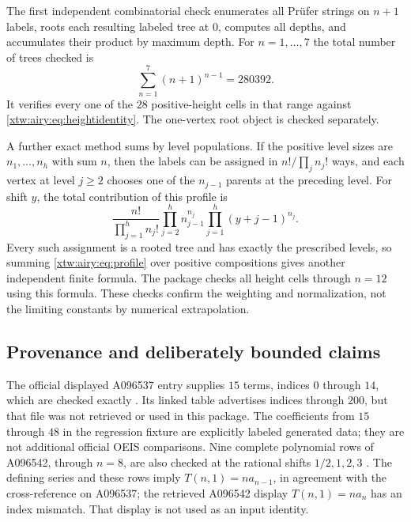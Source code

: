 \documentclass[11pt]{article}
\theoremstyle{remark}\newtheorem{remark}[theorem]{Remark}
\begin{document}
The first independent combinatorial check enumerates all Pr\"ufer strings on
$n+1$ labels, roots each resulting labeled tree at $0$, computes all depths,
and accumulates their product by maximum depth. For $n=1,\ldots,7$ the total
number of trees checked is
\[
 \sum_{n=1}^7(n+1)^{n-1}=280392.
\]
It verifies every one of the $28$ positive-height cells in that range against
\eqref{xtw:airy:eq:heightidentity}. The one-vertex root object is checked separately.

A further exact method sums by level populations. If the positive level
sizes are $n_1,\ldots,n_h$ with sum $n$, then the labels can be assigned in
$n!/\prod_jn_j!$ ways, and each vertex at level $j\ge2$ chooses one of the
$n_{j-1}$ parents at the preceding level. For shift $y$, the total contribution
of this profile is
\begin{equation}\label{xtw:airy:eq:profile}
 \frac{n!}{\prod_{j=1}^h n_j!}
 \prod_{j=2}^h n_{j-1}^{n_j}
 \prod_{j=1}^h(y+j-1)^{n_j}.
\end{equation}
Every such assignment is a rooted tree and has exactly the prescribed levels,
so summing \eqref{xtw:airy:eq:profile} over positive compositions gives another
independent finite formula. The package checks all height cells through
$n=12$ using this formula. These checks confirm the weighting and
normalization, not the limiting constants by numerical extrapolation.

\subsection{Provenance and deliberately bounded claims}
The official displayed A096537 entry supplies $15$ terms, indices $0$ through
$14$, which are checked exactly \cite{oeis537}. Its linked table advertises
indices through $200$, but that file was not retrieved or used in this
package. The coefficients from $15$ through $48$ in the regression fixture
are explicitly labeled generated data; they are not additional official
OEIS comparisons. Nine complete polynomial rows of A096542, through $n=8$,
are also checked at the rational shifts $1/2,1,2,3$ \cite{oeis542}.
The defining series and these rows imply
$T(n,1)=n a_{n-1}$, in agreement with the cross-reference on A096537; the
retrieved A096542 display $T(n,1)=na_n$ has an index mismatch. That display
is not used as an input identity.
\end{document}
